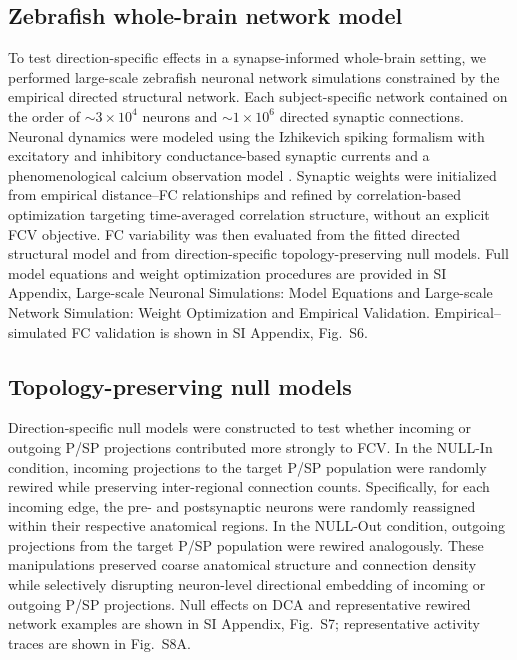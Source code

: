 \documentclass[9pt,twocolumn,twoside]{pnas-new}
\begin{document}
{\subsection*{Zebrafish whole-brain network model}

To test direction-specific effects in a synapse-informed whole-brain setting, we performed large-scale zebrafish neuronal network simulations constrained by the empirical directed structural network. Each subject-specific network contained on the order of $\sim3\times 10^{4}$ neurons and $\sim1\times 10^{6}$ directed synaptic connections. Neuronal dynamics were modeled using the Izhikevich spiking formalism \citep{izhikevich2003simple} with excitatory and inhibitory conductance-based synaptic currents and a phenomenological calcium observation model \citep{rahmati2016inferring,yaksi2006reconstruction}. Synaptic weights were initialized from empirical distance--FC relationships and refined by correlation-based optimization targeting time-averaged correlation structure, without an explicit FCV objective. FC variability was then evaluated from the fitted directed structural model and from direction-specific topology-preserving null models. Full model equations and weight optimization procedures are provided in SI Appendix, Large-scale Neuronal Simulations: Model Equations and Large-scale Network Simulation: Weight Optimization and Empirical Validation. Empirical--simulated FC validation is shown in SI Appendix, Fig.~S6.


\subsection*{Topology-preserving null models}

Direction-specific null models were constructed to test whether incoming or outgoing P/SP projections contributed more strongly to FCV. In the NULL-In condition, incoming projections to the target P/SP population were randomly rewired while preserving inter-regional connection counts. Specifically, for each incoming edge, the pre- and postsynaptic neurons were randomly reassigned within their respective anatomical regions. In the NULL-Out condition, outgoing projections from the target P/SP population were rewired analogously. These manipulations preserved coarse anatomical structure and connection density while selectively disrupting neuron-level directional embedding of incoming or outgoing P/SP projections. Null effects on DCA and representative rewired network examples are shown in SI Appendix, Fig.~S7; representative activity traces are shown in Fig.~S8A.


}
\end{document}
